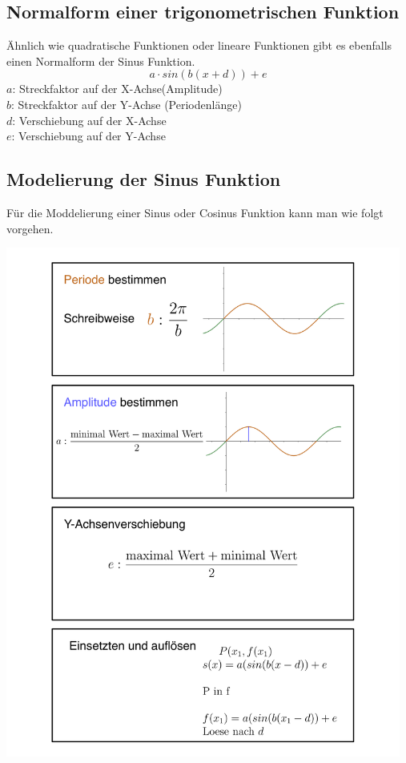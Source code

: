 \subsection{Normalform einer trigonometrischen Funktion}\label{sec:Trigonometrie/Normalform einer trigonometrischen Funktion}
Ähnlich wie quadratische Funktionen oder lineare Funktionen gibt es ebenfalls einen Normalform der Sinus Funktion.
\[a\cdot sin(b(x+d))+e\]
$a$: Streckfaktor auf der X-Achse(Amplitude) \\
$b$: Streckfaktor auf der Y-Achse (Periodenlänge)\\
$d$: Verschiebung auf der X-Achse\\
$e$: Verschiebung auf der Y-Achse \\
	\pagebreak
	
\subsection{Modelierung der Sinus Funktion}\label{sec:Trigonometrie/Modelierung der Sinus Funktion}
Für die Moddelierung einer Sinus oder Cosinus Funktion kann man wie folgt vorgehen.

\includegraphics[width=13cm]{Media/Modelierung_von_Sinus_Algorythmus}

